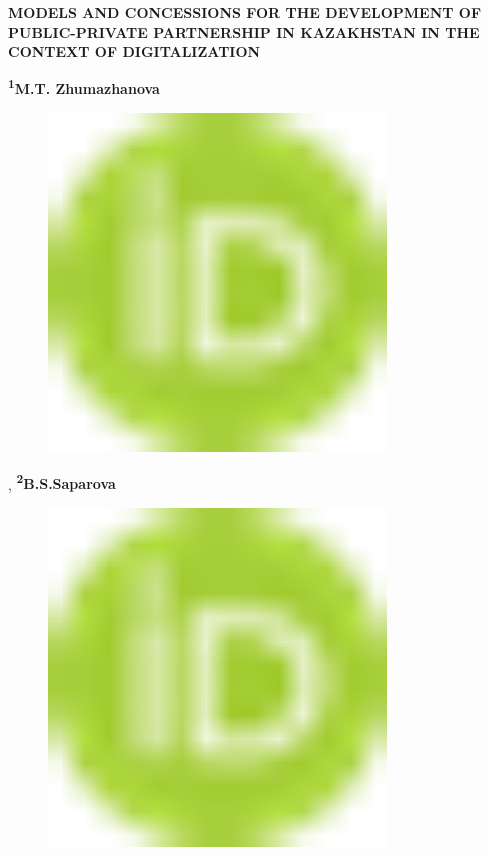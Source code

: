 
{\bfseries MODELS AND CONCESSIONS FOR THE DEVELOPMENT OF PUBLIC-PRIVATE
PARTNERSHIP IN KAZAKHSTAN IN THE CONTEXT OF DIGITALIZATION}

{\bfseries \textsuperscript{1}M.T.
Zhumazhanova}
\begin{figure}[H]
	\centering
	\includegraphics[width=0.8\textwidth]{media/ekon2/image1}
	\caption*{}
\end{figure}
{\bfseries \textsuperscript{\envelope }}
,
{\bfseries \textsuperscript{2}B.S.Saparova}
\begin{figure}[H]
	\centering
	\includegraphics[width=0.8\textwidth]{media/ekon2/image1}
	\caption*{}
\end{figure}
